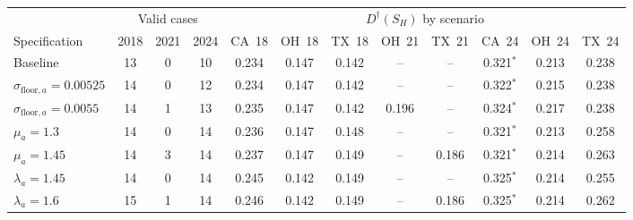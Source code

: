 \begin{tabular}{@{}lccccccccccc@{}}
\toprule
 & \multicolumn{3}{c}{Valid cases} & \multicolumn{8}{c}{\(D^\dagger(S_H)\) by scenario} \\
\cmidrule(lr){2-4}\cmidrule(l){5-12}
Specification & 2018 & 2021 & 2024 & CA~18 & OH~18 & TX~18 & OH~21 & TX~21 & CA~24 & OH~24 & TX~24 \\
\midrule
Baseline & 13 & 0 & 10 & 0.234 & 0.147 & 0.142 & -- & -- & 0.321\(^{\ast}\) & 0.213 & 0.238 \\
\midrule
\(\sigma_{\mathrm{floor},a}=0.00525\) & 14 & 0 & 12 & 0.234 & 0.147 & 0.142 & -- & -- & 0.322\(^{\ast}\) & 0.215 & 0.238 \\
\(\sigma_{\mathrm{floor},a}=0.0055\) & 14 & 1 & 13 & 0.235 & 0.147 & 0.142 & 0.196 & -- & 0.324\(^{\ast}\) & 0.217 & 0.238 \\
\(\mu_a=1.3\) & 14 & 0 & 14 & 0.236 & 0.147 & 0.148 & -- & -- & 0.321\(^{\ast}\) & 0.213 & 0.258 \\
\(\mu_a=1.45\) & 14 & 3 & 14 & 0.237 & 0.147 & 0.149 & -- & 0.186 & 0.321\(^{\ast}\) & 0.214 & 0.263 \\
\(\lambda_a=1.45\) & 14 & 0 & 14 & 0.245 & 0.142 & 0.149 & -- & -- & 0.325\(^{\ast}\) & 0.214 & 0.255 \\
\(\lambda_a=1.6\) & 15 & 1 & 14 & 0.246 & 0.142 & 0.149 & -- & 0.186 & 0.325\(^{\ast}\) & 0.214 & 0.262 \\
\bottomrule
\end{tabular}
